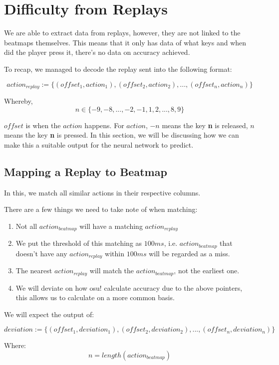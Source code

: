 
\section{Difficulty from Replays}

We are able to extract data from replays, however, they are not linked to the beatmaps themselves. This means that it only has data of what keys and when did the player press it, there's no data on accuracy achieved.

To recap, we managed to decode the replay sent into the following format:

$$ action_{replay} := \lbrace(offset_1, action_1), (offset_2, action_2), ... , (offset_n, action_n)\rbrace $$

Whereby, 
$$n \in \lbrace-9, -8, ... , -2, -1, 1, 2, ... , 8, 9\rbrace$$

$offset$ is when the $action$ happens. For $action$, $-n$ means the key \textbf{n} is released, $n$ means the key \textbf{n} is pressed. In this section, we will be discussing how we can make this a suitable output for the neural network to predict.

\subsection{Mapping a Replay to Beatmap}

In this, we match all similar actions in their respective columns.

There are a few things we need to take note of when matching:
\begin{enumerate}
	\item Not all $action_{beatmap}$ will have a matching $action_{replay}$
	\item We put the threshold of this matching as $100ms$, i.e. $action_{beatmap}$ that doesn't have any $action_{replay}$ within $100ms$ will be regarded as a miss.
	\item The nearest $action_{replay}$ will match the $action_{beatmap}$, not the earliest one.
	\item We will deviate on how osu! calculate accuracy due to the above pointers, this allows us to calculate on a more common basis.
\end{enumerate}

We will expect the output of:

$$ deviation := \lbrace(offset_1, deviation_1), (offset_2, deviation_2), ..., (offset_n, deviation_n)\rbrace $$

Where:
$$ n = length(action_{beatmap}) $$

